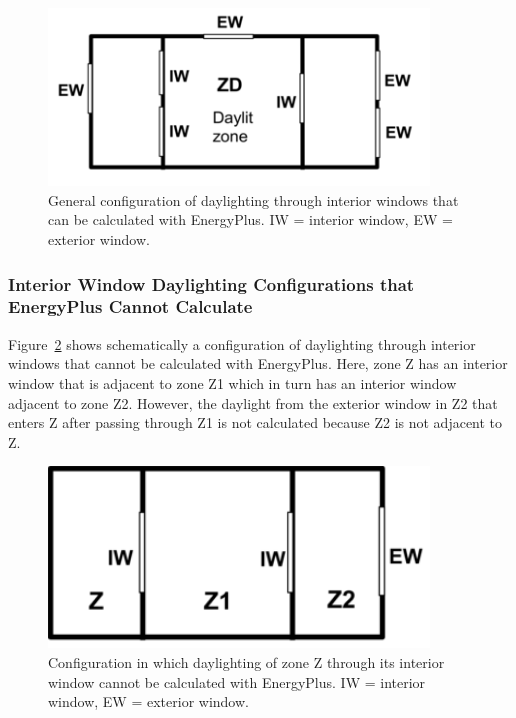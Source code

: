 \begin{figure}[hbtp] %
\centering
\includegraphics[width=0.9\textwidth, height=0.9\textheight, keepaspectratio=true]{media/image103.png}
\caption{General configuration of daylighting through interior windows that can be calculated with EnergyPlus. IW = interior window, EW = exterior window. \protect \label{fig:general-configuration-of-daylighting-through}}
\end{figure}

\subsubsection{Interior Window Daylighting Configurations that EnergyPlus Cannot Calculate}\label{interior-window-daylighting-configurations-that-energyplus-cannot-calculate}

Figure~\ref{fig:configuration-in-which-daylighting-of-zone-z} shows schematically a configuration of daylighting through interior windows that cannot be calculated with EnergyPlus. Here, zone Z has an interior window that is adjacent to zone Z1 which in turn has an interior window adjacent to zone Z2. However, the daylight from the exterior window in Z2 that enters Z after passing through Z1 is not calculated because Z2 is not adjacent to Z.

\begin{figure}[hbtp] %
\centering
\includegraphics[width=0.9\textwidth, height=0.9\textheight, keepaspectratio=true]{media/image104.png}
\caption{Configuration in which daylighting of zone Z through its interior window  cannot be calculated with EnergyPlus. IW = interior window, EW = exterior window. \protect \label{fig:configuration-in-which-daylighting-of-zone-z}}
\end{figure}


